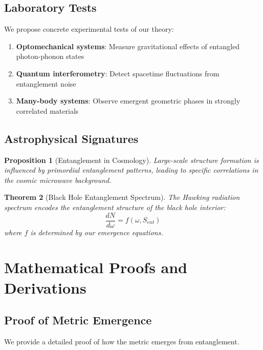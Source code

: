 \documentclass[12pt,a4paper]{article}
\theoremstyle{plain}
\newtheorem{theorem}{Theorem}[section]
\newtheorem{proposition}[theorem]{Proposition}
\theoremstyle{definition}
\theoremstyle{remark}
\begin{document}
\subsection{Laboratory Tests}

We propose concrete experimental tests of our theory:

\begin{enumerate}
\item \textbf{Optomechanical systems}: Measure gravitational effects of entangled photon-phonon states
\item \textbf{Quantum interferometry}: Detect spacetime fluctuations from entanglement noise
\item \textbf{Many-body systems}: Observe emergent geometric phases in strongly correlated materials
\end{enumerate}

\subsection{Astrophysical Signatures}

\begin{proposition}[Entanglement in Cosmology]
Large-scale structure formation is influenced by primordial entanglement patterns, leading to specific correlations in the cosmic microwave background.
\end{proposition}

\begin{theorem}[Black Hole Entanglement Spectrum]
The Hawking radiation spectrum encodes the entanglement structure of the black hole interior:
\[\frac{dN}{d\omega} = f(\omega, S_{ent})\]
where $f$ is determined by our emergence equations.
\end{theorem}

\section{Mathematical Proofs and Derivations}

\subsection{Proof of Metric Emergence}

We provide a detailed proof of how the metric emerges from entanglement.
\end{document}
